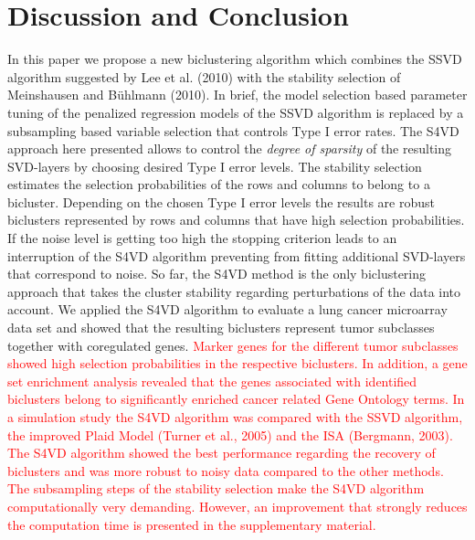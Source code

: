 \documentclass{bioinfo}
\begin{document}
\section{Discussion and Conclusion}
In this paper we propose a new biclustering algorithm which combines the SSVD algorithm suggested by Lee et al. (2010) with the stability selection of Meinshausen and B\"uhlmann (2010). In brief, the model selection based parameter tuning of the penalized regression models of the SSVD algorithm is replaced by a subsampling based variable selection that controls Type I error rates. The S4VD approach here presented allows to control the \textit{degree of sparsity} of the resulting SVD-layers by choosing desired Type I error levels. The stability selection estimates the selection probabilities of the rows and columns to belong to a bicluster. %
Depending on the chosen Type I error levels the results are robust biclusters represented by rows and columns that have high selection probabilities. If the noise level is getting too high the stopping criterion leads to an interruption of the S4VD algorithm preventing from fitting additional SVD-layers that correspond to noise. %
So far, the S4VD method is the only biclustering approach that takes the cluster stability regarding perturbations of the data into account. 
We applied the S4VD algorithm to evaluate a lung cancer microarray data set and showed that the resulting biclusters represent tumor subclasses together with coregulated genes. \textcolor{red}{Marker genes for the different tumor subclasses showed high selection probabilities in the respective biclusters. In addition, a gene set enrichment analysis revealed that the genes associated with identified biclusters belong to significantly enriched cancer related Gene Ontology terms. In a simulation study the S4VD algorithm was compared with the SSVD algorithm, the improved Plaid Model (Turner et al., 2005) and the ISA (Bergmann, 2003). The S4VD algorithm showed the best performance regarding the recovery of biclusters and was more robust to noisy data compared to the other methods.} 
\textcolor{red}{The subsampling steps of the stability selection make the S4VD algorithm computationally very demanding. However, an improvement that strongly reduces the computation time is presented in the supplementary material.} 

\nocite{Alexa2006}
\nocite{Csardi2010}
\nocite{biclust}

%
%




\end{document}
